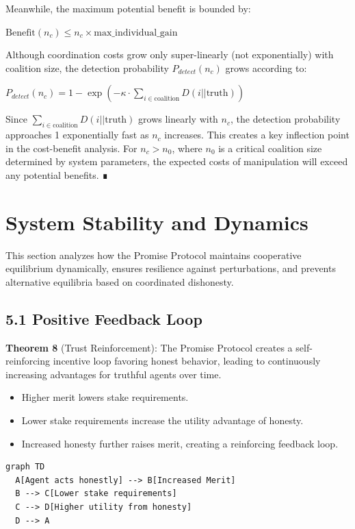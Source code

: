 \documentclass[11pt]{article}
\begin{document}
Meanwhile, the maximum potential benefit is bounded by:

\(\text{Benefit}(n_c) \leq n_c \times \text{max\_individual\_gain}\)

Although coordination costs grow only super-linearly (not exponentially) with coalition size, the detection probability \(P_{detect}(n_c)\) grows according to:

\(P_{detect}(n_c) = 1 - \exp(-\kappa \cdot \sum_{i \in \text{coalition}} D(i||\text{truth}))\)

Since \(\sum_{i \in \text{coalition}} D(i||\text{truth})\) grows linearly with \(n_c\), the detection probability approaches 1 exponentially fast as \(n_c\) increases. This creates a key inflection point in the cost-benefit analysis. For \(n_c > n_0\), where \(n_0\) is a critical coalition size determined by system parameters, the expected costs of manipulation will exceed any potential benefits. ∎
\section{System Stability and Dynamics}
\label{sec:org34191be}

This section analyzes how the Promise Protocol maintains cooperative equilibrium dynamically, ensures resilience against perturbations, and prevents alternative equilibria based on coordinated dishonesty.
\subsection{5.1 Positive Feedback Loop}
\label{sec:orgc8af158}

\textbf{Theorem 8} (Trust Reinforcement):
The Promise Protocol creates a self-reinforcing incentive loop favoring honest behavior, leading to continuously increasing advantages for truthful agents over time.

\begin{itemize}
\item Higher merit lowers stake requirements.
\item Lower stake requirements increase the utility advantage of honesty.
\item Increased honesty further raises merit, creating a reinforcing feedback loop.
\end{itemize}

\begin{verbatim}
graph TD
  A[Agent acts honestly] --> B[Increased Merit]
  B --> C[Lower stake requirements]
  C --> D[Higher utility from honesty]
  D --> A
\end{verbatim}
\end{document}
